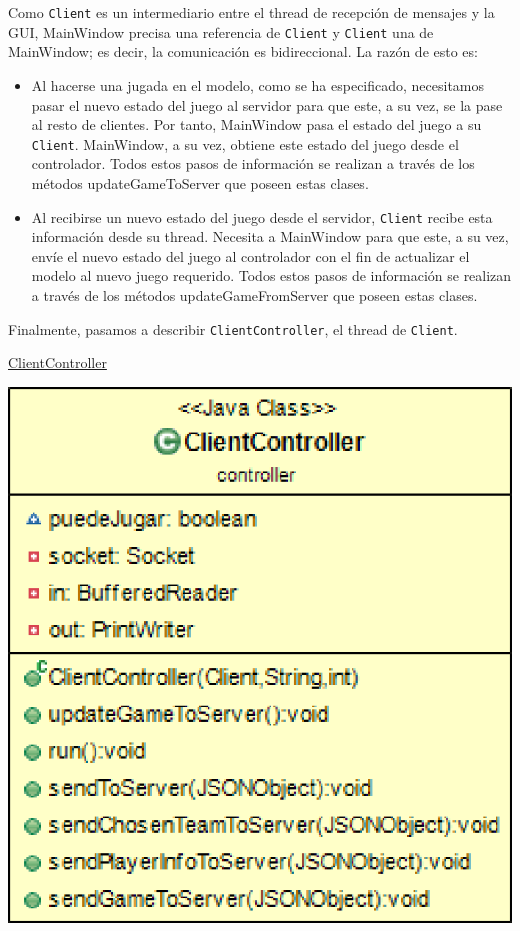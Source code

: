 \documentclass[12pt,a4paper,openright]{book}
\theoremstyle{break}
\begin{document}
Como \texttt{Client} es un intermediario entre el thread de recepción de mensajes y la GUI, MainWindow precisa una referencia de \texttt{Client} y \texttt{Client} una de MainWindow; es decir, la comunicación es bidireccional. La razón de esto es:

\begin{itemize}
\item Al hacerse una jugada en el modelo, como se ha especificado, necesitamos pasar el nuevo estado del juego al servidor para que este, a su vez, se la pase al resto de clientes. Por tanto, MainWindow pasa el estado del juego a su \texttt{Client}. MainWindow, a su vez, obtiene este estado del juego desde el controlador. Todos estos pasos de información se realizan a través de los métodos updateGameToServer que poseen estas clases.

\item Al recibirse un nuevo estado del juego desde el servidor, \texttt{Client} recibe esta información desde su thread. Necesita a MainWindow para que este, a su vez, envíe el nuevo estado del juego al controlador con el fin de actualizar el modelo al nuevo juego requerido. Todos estos pasos de información se realizan a través de los métodos updateGameFromServer que poseen estas clases.
\end{itemize}

Finalmente, pasamos a describir \texttt{ClientController}, el thread de \texttt{Client}.

\newpage

\underline{ClientController}

\begin{center}
\includegraphics[scale=0.3]{ClientController-sprint7.png} 
\end{center}
\end{document}
